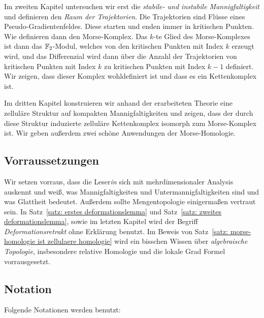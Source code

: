 \documentclass[a4paper,11pt,twoside]{scrreport}
\begin{document}
Im zweiten Kapitel untersuchen wir erst die \textit{stabile- und instabile Mannigfaltigkeit} und 
definieren den \textit{Raum der Trajektorien}. Die Trajektorien sind Flüsse eines Pseudo-Gradien\-ten\-feldes.
Diese starten und enden immer in kritischen Punkten. Wie definieren dann den Morse-Komplex.
Das $k$-te Glied des Morse-Komplexes ist dann das ${ \mathbb F }_2$-Modul, welches von den kritischen 
Punkten mit Index $k$ erzeugt wird, und das Differenzial wird dann über die Anzahl der 
Trajektorien von kritischen Punkten mit Index $k$ zu kritischen Punkten mit Index $k - 1$ 
definiert. Wir zeigen, dass dieser Komplex wohldefiniert ist und dass es ein Kettenkomplex ist. 

Im dritten Kapitel konstruieren wir anhand der erarbeiteten Theorie eine zelluläre Struktur auf kompakten 
Mannigfaltigkeiten und zeigen, dass der durch diese Struktur induzierte zelluläre Kettenkomplex 
isomorph zum Morse-Komplex ist. Wir geben außerdem zwei schöne Anwendungen der Morse-Homologie.

\subsection*{Vorraussetzungen}

Wir setzen vorraus, dass die Leser\textit{in} sich mit mehrdimensionaler Analysis auskennt und weiß, was 
Mannigfaltigkeiten und Untermannigfaltigkeiten sind und was Glattheit bedeutet. Außerdem sollte 
Mengentopologie einigermaßen vertraut sein. In Satz~\ref{satz: erstes deformationslemma}
und Satz~\ref{satz: zweites deformationslemma}, sowie im letzten Kapitel wird der Begriff
\textit{Deformationsretrakt} ohne Erklärung benutzt. Im Beweis von 
Satz~\ref{satz: morse-homologie ist zellulaere homologie} wird ein bisschen Wissen über 
\textit{algebraische Topologie}, insbesondere relative Homologie und die lokale Grad Formel 
vorrausgesetzt. 

\subsection*{Notation}

Folgende Notationen werden benutzt:
\end{document}
